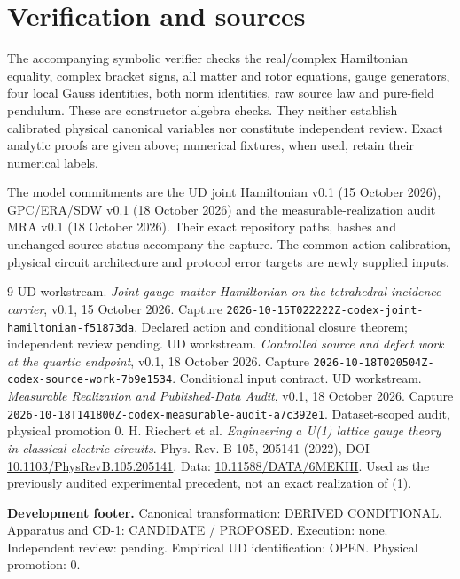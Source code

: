 \documentclass[10pt,a4paper]{article}
\begin{document}
\newpage
\section{Verification and sources}
The accompanying symbolic verifier checks the real/complex Hamiltonian equality, complex bracket signs, all matter and rotor equations, gauge generators, four local Gauss identities, both norm identities, raw source law and pure-field pendulum. These are constructor algebra checks. They neither establish calibrated physical canonical variables nor constitute independent review. Exact analytic proofs are given above; numerical fixtures, when used, retain their numerical labels.

The model commitments are the UD joint Hamiltonian v0.1 (15 October 2026), GPC/ERA/SDW v0.1 (18 October 2026) and the measurable-realization audit MRA v0.1 (18 October 2026). Their exact repository paths, hashes and unchanged source status accompany the capture. The common-action calibration, physical circuit architecture and protocol error targets are newly supplied inputs.

\begin{thebibliography}{9}
 UD workstream. \emph{Joint gauge--matter Hamiltonian on the tetrahedral incidence carrier}, v0.1, 15 October 2026. Capture \texttt{2026-10-15T022222Z-codex-joint-hamiltonian-f51873da}. Declared action and conditional closure theorem; independent review pending.
 UD workstream. \emph{Controlled source and defect work at the quartic endpoint}, v0.1, 18 October 2026. Capture \texttt{2026-10-18T020504Z-codex-source-work-7b9e1534}. Conditional input contract.
 UD workstream. \emph{Measurable Realization and Published-Data Audit}, v0.1, 18 October 2026. Capture \texttt{2026-10-18T141800Z-codex-measurable-audit-a7c392e1}. Dataset-scoped audit, physical promotion 0.
 H. Riechert et al. \emph{Engineering a U(1) lattice gauge theory in classical electric circuits}. Phys. Rev. B 105, 205141 (2022), DOI \href{https://doi.org/10.1103/PhysRevB.105.205141}{10.1103/PhysRevB.105.205141}. Data: \href{https://doi.org/10.11588/DATA/6MEKHI}{10.11588/DATA/6MEKHI}. Used as the previously audited experimental precedent, not an exact realization of (1).
\end{thebibliography}
\vspace{8pt}\textbf{Development footer.} Canonical transformation: DERIVED CONDITIONAL. Apparatus and CD-1: CANDIDATE / PROPOSED. Execution: none. Independent review: pending. Empirical UD identification: OPEN. Physical promotion: 0.
\end{document}
